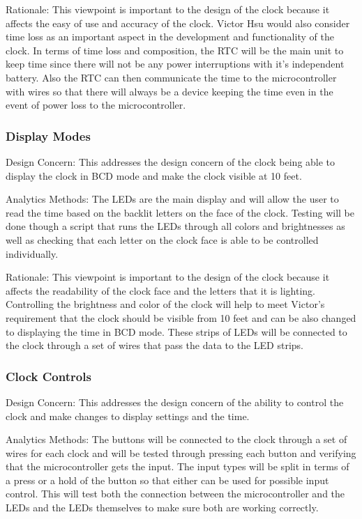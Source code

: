 \documentclass[10pt,draftclsnofoot,onecolumn]{IEEEtran}
\begin{document}
\hfill \break \indent Rationale: This viewpoint is important to the design of the clock because it affects the easy of use and accuracy of the clock.
Victor Hsu would also consider time loss as an important aspect in the development and functionality of the clock.
In terms of time loss and composition, the RTC will be the main unit to keep time since there will not be any power interruptions with it's independent battery.
Also the RTC can then communicate the time to the microcontroller with wires so that there will always be a device keeping the time even in the event of power loss to the microcontroller.

\subsubsection{Display Modes}
\hfill \break \indent Design Concern: This addresses the design concern of the clock being able to display the clock in BCD mode and make the clock visible at 10 feet.

\hfill \break \indent Analytics Methods: The LEDs are the main display and will allow the user to read the time based on the backlit letters on the face of the clock.
Testing will be done though a script that runs the LEDs through all colors and brightnesses as well as checking that each letter on the clock face is able to be controlled individually.

\hfill \break \indent Rationale: This viewpoint is important to the design of the clock because it affects the readability of the clock face and the letters that it is lighting.
Controlling the brightness and color of the clock will help to meet Victor's requirement that the clock should be visible from 10 feet and can be also changed to displaying the time in BCD mode.
These strips of LEDs will be connected to the clock through a set of wires that pass the data to the LED strips.

\subsubsection{Clock Controls}
\hfill \break \indent Design Concern: This addresses the design concern of the ability to control the clock and make changes to display settings and the time.

\hfill \break \indent Analytics Methods: The buttons will be connected to the clock through a set of wires for each clock and will be tested through pressing each button and verifying that the microcontroller gets the input.
The input types will be split in terms of a press or a hold of the button so that either can be used for possible input control.
This will test both the connection between the microcontroller and the LEDs and the LEDs themselves to make sure both are working correctly.
\end{document}
